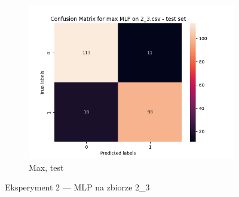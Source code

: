 \documentclass[12pt]{article}
\newcommand*{\subfigwidth}{0.24\textwidth}
\begin{document}
\begin{figure}[H]
\begin{subfigure}[t]{\subfigwidth}
        \includegraphics[width=\linewidth]{img/exp_2/mlp/2_3/max/test_matrix.png}
        \caption{Max, test}
    \end{subfigure} 
    
    \caption{Eksperyment 2 --- MLP na zbiorze 2\_3}\label{fig:figure11}
\end{figure}
\end{document}
